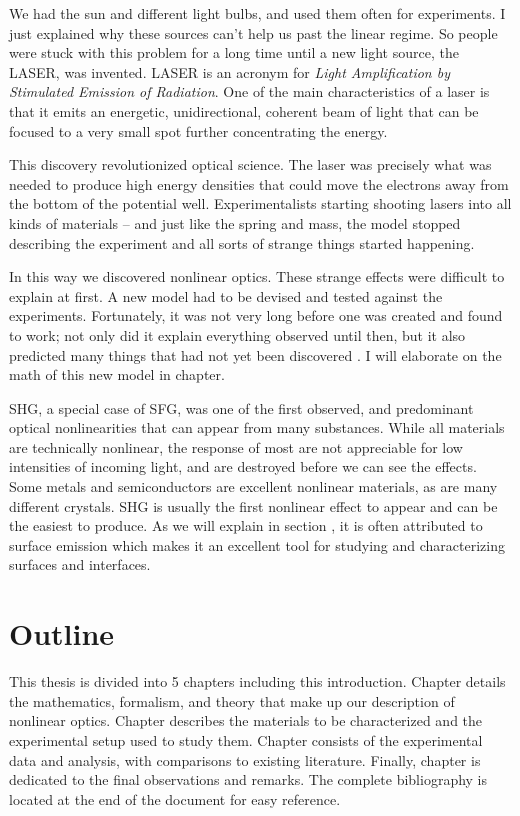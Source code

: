 \documentclass[10pt]{article}
\begin{document}
We had the sun and different light bulbs, and used them often for experiments. I just explained why these sources can't help us past the linear regime. So people were stuck with this problem for a long time until a new light source, the LASER, was invented. LASER is an acronym for \emph{Light Amplification by Stimulated Emission of Radiation}. One of the main characteristics of a laser is that it emits an energetic, unidirectional, coherent beam of light that can be focused to a very small spot further concentrating the energy.

This discovery revolutionized optical science. The laser was precisely what was needed to produce high energy densities that could move the electrons away from the bottom of the potential well. Experimentalists starting shooting lasers into all kinds of materials -- and just like the spring and mass, the model stopped describing the experiment and all sorts of strange things started happening.

In this way we discovered nonlinear optics. These strange effects were difficult to explain at first. A new model had to be devised and tested against the experiments. Fortunately, it was not very long before one was created and found to work; not only did it explain everything observed until then, but it also predicted many things that had not yet been discovered \cite{boyd2003nonlinear, diels2006ultrashort, shen1984principles}. I will elaborate on the math of this new model in chapter.

SHG, a special case of SFG, was one of the first observed, and predominant optical nonlinearities that can appear from many substances. While all materials are technically nonlinear, the response of most are not appreciable for low intensities of incoming light, and are destroyed before we can see the effects. Some metals and semiconductors are excellent nonlinear materials, as are many different crystals. SHG is usually the first nonlinear effect to appear and can be the easiest to produce. As we will explain in section , it is often attributed to surface emission which makes it an excellent tool for studying and characterizing surfaces and interfaces.

\section{Outline}
This thesis is divided into 5 chapters including this introduction. Chapter  details the mathematics, formalism, and theory that make up our description of nonlinear optics. Chapter describes the materials to be characterized and the experimental setup used to study them. Chapter consists of the experimental data and analysis, with comparisons to existing literature. Finally, chapter  is dedicated to the final observations and remarks. The complete bibliography is located at the end of the document for easy reference.
\end{document}
